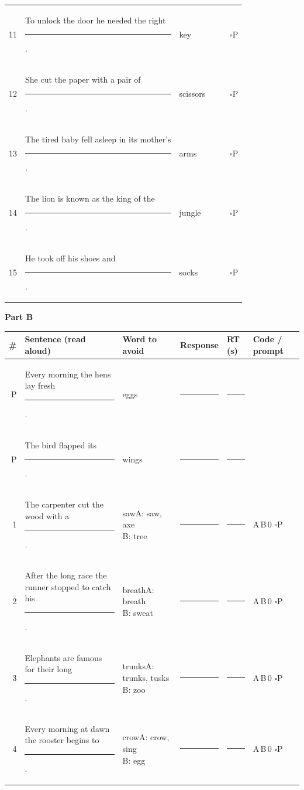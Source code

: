 \documentclass[10pt,a4paper]{article}
\newcommand{\blank}[1][1.2cm]{\rule{#1}{0.4pt}}
\newcommand{\bx}{$\square$}
\begin{document}
{\begin{longtable}{@{}r>{\raggedright\arraybackslash}p{7.2cm}>{\raggedright\arraybackslash}p{1.9cm}p{2.4cm}p{1.1cm}l@{}}
11 & To unlock the door he needed the right \rule{1.1cm}{0.4pt}. & key & \blank[2.2cm] & \blank[0.9cm] & \bx P\\
12 & She cut the paper with a pair of \rule{1.1cm}{0.4pt}. & scissors & \blank[2.2cm] & \blank[0.9cm] & \bx P\\
13 & The tired baby fell asleep in its mother's \rule{1.1cm}{0.4pt}. & arms & \blank[2.2cm] & \blank[0.9cm] & \bx P\\
14 & The lion is known as the king of the \rule{1.1cm}{0.4pt}. & jungle & \blank[2.2cm] & \blank[0.9cm] & \bx P\\
15 & He took off his shoes and \rule{1.1cm}{0.4pt}. & socks & \blank[2.2cm] & \blank[0.9cm] & \bx P\\
\bottomrule\end{longtable}}
\par{}\medskip\textbf{Part B}\par{\small\begin{longtable}{@{}r>{\raggedright\arraybackslash}p{7.2cm}>{\raggedright\arraybackslash}p{1.9cm}p{2.4cm}p{1.1cm}l@{}}\toprule \# & Sentence (read aloud) & Word to avoid & Response & RT (s) & Code / prompt\\ \midrule\endhead
P & Every morning the hens lay fresh \rule{1.1cm}{0.4pt}. & eggs & \blank[2.2cm] & \blank[0.9cm] & \\
P & The bird flapped its \rule{1.1cm}{0.4pt}. & wings & \blank[2.2cm] & \blank[0.9cm] & \\
\midrule
1 & The carpenter cut the wood with a \rule{1.1cm}{0.4pt}. & saw\newline{\scriptsize A: saw, axe\newline B: tree} & \blank[2.2cm] & \blank[0.9cm] & A\,B\,0 \bx P\\
2 & After the long race the runner stopped to catch his \rule{1.1cm}{0.4pt}. & breath\newline{\scriptsize A: breath\newline B: sweat} & \blank[2.2cm] & \blank[0.9cm] & A\,B\,0 \bx P\\
3 & Elephants are famous for their long \rule{1.1cm}{0.4pt}. & trunks\newline{\scriptsize A: trunks, tusks\newline B: zoo} & \blank[2.2cm] & \blank[0.9cm] & A\,B\,0 \bx P\\
4 & Every morning at dawn the rooster begins to \rule{1.1cm}{0.4pt}. & crow\newline{\scriptsize A: crow, sing\newline B: egg} & \blank[2.2cm] & \blank[0.9cm] & A\,B\,0 \bx P\\

\end{longtable}}
\end{document}
